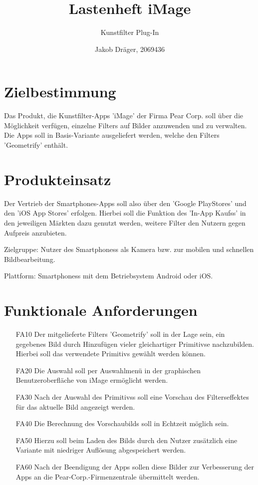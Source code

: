\documentclass[parskip=full]{scrartcl}
\title{Lastenheft iMage}
\subtitle{Kunstfilter Plug-In}
\author{Jakob Dr\"ager, 2069436}
\begin{document}
\maketitle

\section{Zielbestimmung}
Das Produkt, die Kunstfilter-\glspl{App} 'iMage' der Firma Pear Corp. soll \"uber die M\"oglichkeit verf\"ugen, einzelne \glspl{Filter} auf Bilder anzuwenden und zu verwalten. Die \glspl{App} soll in Basis-Variante ausgeliefert werden, welche den \glspl{Filter} 'Geometrify' enth\"alt.

\section{Produkteinsatz}
 Der Vertrieb der \glspl{Smartphone}-\glspl{App} soll also \"uber den '\glspl{Google PlayStore}' und den '\glspl{iOS App Store}' erfolgen. Hierbei soll die Funktion des '\glspl{In-App Kauf}s' in den jeweiligen M\"arkten dazu genutzt werden, weitere Filter den Nutzern gegen Aufpreis anzubieten.
 
Zielgruppe: Nutzer des \glspl{Smartphone}s als Kamera bzw. zur mobilen und schnellen Bildbearbeitung.

Plattform: \glspl{Smartphone}s mit dem Betriebsystem Android oder iOS.

\section{Funktionale Anforderungen}
\begin{itemize}[nosep]
\item[FA10] Der mitgelieferte \glspl{Filter} 'Geometrify' soll in der Lage sein, ein gegebenes Bild durch Hinzuf\"ugen vieler gleichartiger \glspl{Primitiv}e nachzubilden. Hierbei soll das verwendete \glspl{Primitiv} gew\"ahlt werden k\"onnen.
\item[FA20] Die Auswahl soll per Auswahlmen\"u in der graphischen Benutzeroberfl\"ache von iMage erm\"oglicht werden.
\item[FA30] Nach der Auswahl des \glspl{Primitiv}s soll eine Vorschau des \glspl{Filter}effektes f\"ur das aktuelle Bild angezeigt werden.
\item[FA40] Die Berechnung des Vorschaubilds soll in Echtzeit m\"oglich sein.
\item[FA50] Hierzu soll beim Laden des Bilds durch den Nutzer zus\"atzlich eine Variante mit niedriger Aufl\"osung abgespeichert werden.
\item[FA60] Nach der Beendigung der \glspl{App} sollen diese Bilder zur Verbesserung der \glspl{App} an die Pear-Corp.-Firmenzentrale \"ubermittelt werden.
\end{itemize}
\end{document}

